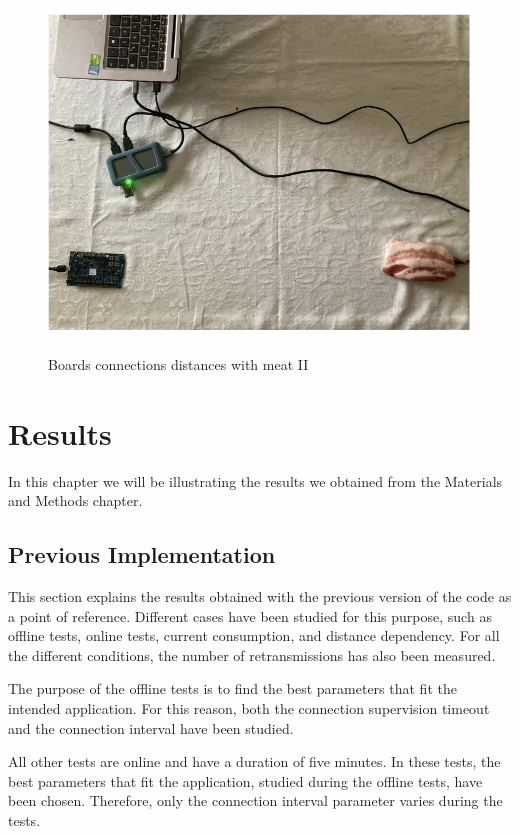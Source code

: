 \documentclass{Configuration_Files/PoliMi3i_thesis}
\begin{document}
\begin{figure}[H]
    \centering
    \includegraphics[scale=0.6]{Test_Procedure/23.png}
    \label{direct_communication_board_PC_23}
    \caption{Boards connections distances with meat II}
\end{figure}

\chapter{Results}

In this chapter we will be illustrating the results we obtained from the Materials and Methods chapter.

\section{Previous Implementation}

This section explains the results obtained with the previous version of the code as a point of reference. Different cases have been studied for this purpose, such as offline tests, online tests, current consumption, and distance dependency. For all the different conditions, the number of retransmissions has also been measured.

The purpose of the offline tests is to find the best parameters that fit the intended application. For this reason, both the connection supervision timeout and the connection interval have been studied.

All other tests are online and have a duration of five minutes. In these tests, the best parameters that fit the application, studied during the offline tests, have been chosen. Therefore, only the connection interval parameter varies during the tests.
\end{document}
